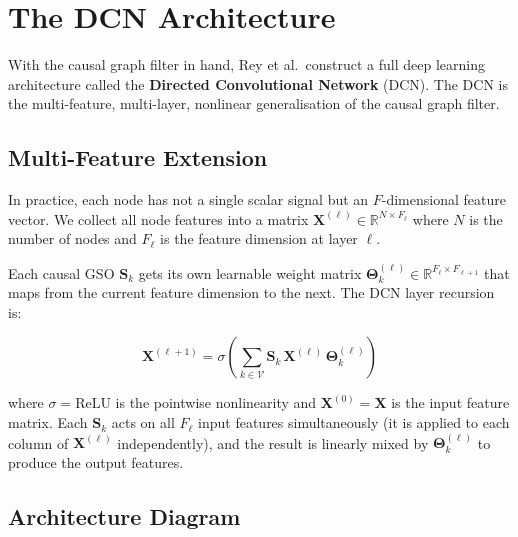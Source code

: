 \section{The DCN Architecture}
\label{sec:dagcn_dcn}

With the causal graph filter in hand, Rey et al.\ construct a full deep learning
architecture called the \textbf{Directed Convolutional Network} (DCN). The DCN
is the multi-feature, multi-layer, nonlinear generalisation of the causal graph
filter.

\subsection{Multi-Feature Extension}

In practice, each node has not a single scalar signal but an
$F$-dimensional feature vector. We collect all node features into a matrix
$\mathbf{X}^{(\ell)} \in \mathbb{R}^{N \times F_\ell}$ where $N$ is the number
of nodes and $F_\ell$ is the feature dimension at layer $\ell$.

Each causal GSO $\mathbf{S}_k$ gets its own learnable weight matrix
$\boldsymbol{\Theta}_k^{(\ell)} \in \mathbb{R}^{F_\ell \times F_{\ell+1}}$ that
maps from the current feature dimension to the next. The DCN layer recursion is:

\begin{equation}
    \mathbf{X}^{(\ell+1)} = \sigma\!\left(
        \sum_{k \in \mathcal{V}} \mathbf{S}_k \, \mathbf{X}^{(\ell)} \,
        \boldsymbol{\Theta}_k^{(\ell)}
    \right)
    \label{eq:dcn_layer}
\end{equation}

where $\sigma = \text{ReLU}$ is the pointwise nonlinearity and $\mathbf{X}^{(0)}
= \mathbf{X}$ is the input feature matrix. Each $\mathbf{S}_k$ acts on all
$F_\ell$ input features simultaneously (it is applied to each column of
$\mathbf{X}^{(\ell)}$ independently), and the result is linearly mixed by
$\boldsymbol{\Theta}_k^{(\ell)}$ to produce the output features.

\subsection{Architecture Diagram}

